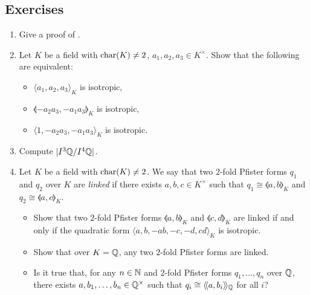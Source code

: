 \documentclass[12pt, leqno, british]{amsart}
\begin{document}
\subsection{Exercises}
\begin{enumerate}
\item Give a proof of .
\item\label{ex:3-dim-reduction} Let $K$ be a field with $\operatorname{char}(K) \neq 2$, $a_1, a_2, a_3 \in K^\times$.
Show that the following are equivalent:
\begin{itemize}
\item $\langle a_1, a_2, a_3 \rangle_{K}$ is isotropic,
\item $\llangle -a_2a_3, -a_1a_3 \rrangle_K$ is isotropic,
\item $\langle 1, -a_2a_3, -a_1a_3 \rangle_K$ is isotropic.
\end{itemize}
\item Compute $\lvert I^3 \mathbb Q/I^4 \mathbb Q \rvert$.
\item Let $K$ be a field with $\operatorname{char}(K) \neq 2$.
We say that two $2$-fold Pfister forms $q_1$ and $q_2$ over $K$ are \emph{linked} if there exists $a, b, c \in K^\times$ such that $q_1 \cong \llangle a, b \rrangle_K$ and $q_2 \cong \llangle a, c \rrangle_K$.
\begin{itemize}
\item Show that two $2$-fold Pfister forms $\llangle a, b \rrangle_K$ and $\llangle c, d \rrangle_K$ are linked if and only if the quadratic form $\langle a, b, -ab, -c, -d, cd \rangle_K$ is isotropic.
\item Show that over $K = \mathbb Q$, any two $2$-fold Pfister forms are linked.
\item Is it true that, for any $n \in \mathbb N$ and $2$-fold Pfister forms $q_1, \ldots, q_n$ over $\mathbb Q$, there exists $a, b_1, \ldots, b_n \in \mathbb Q^\times$ such that $q_i \cong \langle\!\langle a, b_i \rangle\!\rangle_{\mathbb Q}$ for all $i$?
\end{itemize}
\end{enumerate}
\end{document}
